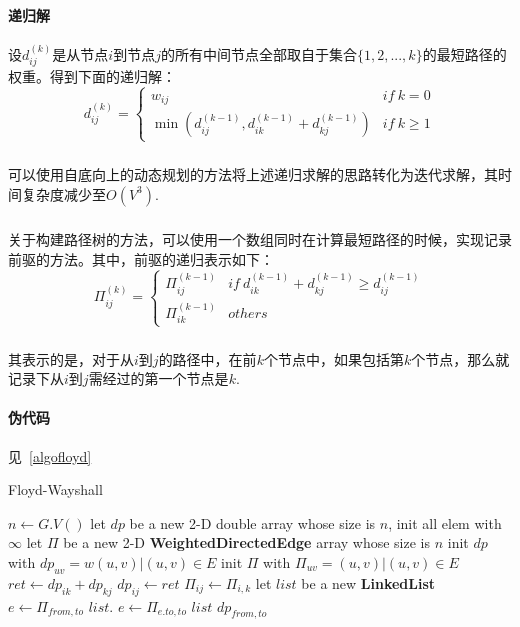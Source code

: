\documentclass[UTF8,a4paper]{ctexart}
\begin{document}
\paragraph{递归解}设$d_{ij}^{(k)}$是从节点$i$到节点$j$的所有中间节点全部取自于集合$\{1,2,...,k\}$的最短路径的权重。得到下面的递归解：
\[
    d_{ij}^{(k)}=\begin{cases}
        w_{ij}                                             & if~ k=0     \\
        \min(d_{ij}^{(k-1)},d_{ik}^{(k-1)}+d_{kj}^{(k-1)}) & if~ k\geq 1
    \end{cases}
\]
\subparagraph{}可以使用自底向上的动态规划的方法将上述递归求解的思路转化为迭代求解，其时间复杂度减少至$O(V^3)$.
\subparagraph{}关于构建路径树的方法，可以使用一个数组同时在计算最短路径的时候，实现记录前驱的方法。其中，前驱的递归表示如下：
\[
    \Pi_{ij}^{(k)}=\begin{cases}
        \Pi_{ij}^{(k-1)} & if~ d_{ik}^{(k-1)}+d_{kj}^{(k-1)} \geq d_{ij}^{(k-1)} \\
        \Pi_{ik}^{(k-1)} & others
    \end{cases}
\]
\subparagraph{}其表示的是，对于从$i$到$j$的路径中，在前$k$个节点中，如果包括第$k$个节点，那么就记录下从$i$到$j$需经过的第一个节点是$k$.
\paragraph{伪代码}见~\ref{algofloyd}
\begin{algorithm}[htbp]
    \caption{Floyd-Wayshall}\label{algofloyd}
    \begin{algorithmic}[1] %
        \State $n\gets G.V()$
        \State let $dp$ be a new 2-D double array whose size is $n$, init all elem with $\infty$
        \State let $\Pi$ be a new 2-D \textbf{WeightedDirectedEdge} array whose size is $n$
        \State init $dp$ with $dp_{uv} = w(u,v)|(u,v)\in E$
        \State init $\Pi$ with $\Pi_{uv} = (u,v)|(u,v)\in E$
        \State $ret\gets dp_{ik}+dp_{kj}$
        \State $dp_{ij}\gets ret$
        \State $\Pi_{ij}\gets \Pi_{i,k}$
        \EndIf
        \EndFor
        \EndFor
        \EndFor
        \EndFunction
        \State
        \State let $list$ be a new \textbf{LinkedList}
        \State $e\gets \Pi_{from,to}$
        \State $list.$
        \State $e\gets \Pi_{e.to,to}$
        \EndWhile
        \State \Return $list$
        \EndIf
        \State {}
        \EndFunction
        \State
        \State \Return $dp_{from,to}$
        \EndFunction
    \end{algorithmic}
\end{algorithm}
\end{document}
